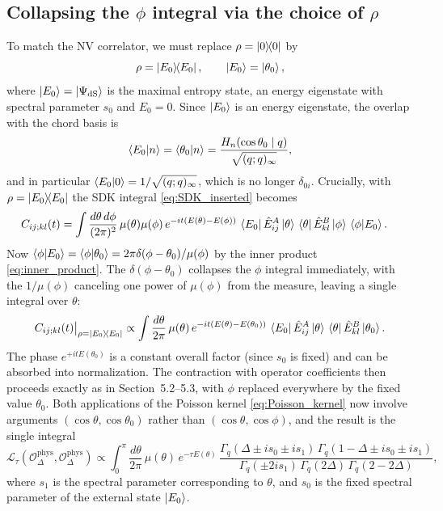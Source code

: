\documentclass[12pt]{scrarticle}
\newcommand{\dS}{\mathrm{dS}}
\newcommand{\phys}{\mathrm{phys}}
\begin{document}
\subsection{Collapsing the $\phi$ integral via the choice of $\rho$}
To match the NV correlator, we must replace $\rho = \ketbra{0}{0}$ by
\begin{equation}
    \rho = \ketbra{E_0}{E_0}, \qquad \ket{E_0} = \ket{\theta_0},
    \label{eq:rho_E0}
\end{equation}
where $\ket{E_0} = \ket{\Psi_\dS}$ is the maximal entropy state, an energy eigenstate
with spectral parameter $s_0$ and $E_0 = 0$. Since $\ket{E_0}$ is an energy eigenstate,
the overlap with the chord basis is
\begin{equation}
    \braket{E_0|n}
    = \braket{\theta_0|n}
    = \frac{H_n(\cos\theta_0\mid q)}{\sqrt{(q;q)_\infty}},
\end{equation}
and in particular $\braket{E_0|0} = 1/\sqrt{(q;q)_\infty}$, which is no longer
$\delta_{0i}$. Crucially, with $\rho = \ketbra{E_0}{E_0}$ the SDK integral
\eqref{eq:SDK_inserted} becomes
\begin{align}
    C_{ij;kl}(t)
    &= \int\frac{d\theta\,d\phi}{(2\pi)^2}\,\mu(\theta)\mu(\phi)\,
       e^{-it(E(\theta)-E(\phi))}\,
       \bra{E_0}\hat{E}^A_{ij}\ket{\theta}\,
       \bra{\theta}\hat{E}^B_{kl}\ket{\phi}\,
       \braket{\phi|E_0}.
\end{align}
Now $\braket{\phi|E_0} = \braket{\phi|\theta_0} = 2\pi\delta(\phi-\theta_0)/\mu(\phi)$
by the inner product \eqref{eq:inner_product}. The $\delta(\phi-\theta_0)$ collapses
the $\phi$ integral immediately, with the $1/\mu(\phi)$ canceling one power of $\mu(\phi)$
from the measure, leaving a single integral over $\theta$:
\begin{equation}
    C_{ij;kl}(t)\big|_{\rho=\ketbra{E_0}{E_0}}
    \propto
    \int\frac{d\theta}{2\pi}\,\mu(\theta)\,
    e^{-it(E(\theta)-E(\theta_0))}\,
    \bra{E_0}\hat{E}^A_{ij}\ket{\theta}\,
    \bra{\theta}\hat{E}^B_{kl}\ket{\theta_0}.
\end{equation}
The phase $e^{+itE(\theta_0)}$ is a constant overall factor (since $s_0$ is fixed)
and can be absorbed into normalization. The contraction with operator coefficients
then proceeds exactly as in Section~5.2--5.3, with $\phi$ replaced everywhere by
the fixed value $\theta_0$. Both applications of the Poisson kernel \eqref{eq:Poisson_kernel}
now involve arguments $(\cos\theta, \cos\theta_0)$ rather than $(\cos\theta, \cos\phi)$,
and the result is the single integral
\begin{equation}
    \boxed{
    \mathcal{L}_\tau(\mathcal{O}^\phys_\Delta, \mathcal{O}^\phys_\Delta)
    \propto
    \int_0^\pi \frac{d\theta}{2\pi}\,\mu(\theta)\,e^{-\tau E(\theta)}\,
    \frac{\Gamma_q(\Delta\pm is_0\pm is_1)\,\Gamma_q(1-\Delta\pm is_0\pm is_1)}
         {\Gamma_q(\pm 2is_1)\,\Gamma_q(2\Delta)\,\Gamma_q(2-2\Delta)},
    }
    \label{eq:final_correlator}
\end{equation}
where $s_1$ is the spectral parameter corresponding to $\theta$, and $s_0$ is the
fixed spectral parameter of the external state $\ket{E_0}$.
\end{document}
